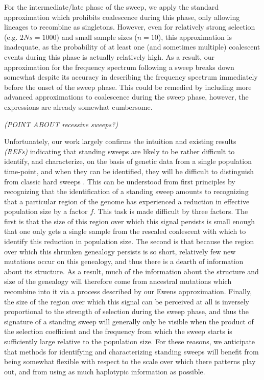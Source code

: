 \documentclass[a4paper,10pt]{article}
\newcommand{\gc}[1]{{\it \color{red} (#1)} }
\begin{document}
For the intermediate/late phase of the sweep, we apply the standard approximation which prohibits coalescence during this phase, only allowing lineages to recombine as singletons. However, even for relatively strong selection (e.g. $2Ns = 1000$) and small sample sizes ($n = 10$), this approximation is inadequate, as the probability of at least one (and sometimes multiple) coalescent events during this phase is actually relatively high. As a result, our approximation for the frequency spectrum following a sweep breaks down somewhat despite its accuracy in describing the frequency spectrum immediately before the onset of the sweep phase. This could be remedied by including more advanced approximations to coalescence during the sweep phase, however, the expressions are already somewhat cumbersome. 

\gc{POINT ABOUT recessive sweeps?}

Unfortunately, our work largely confirms the intuition and existing results \gc{REFs} indicating that standing sweeps are likely to be rather difficult to identify, and characterize, on the basis of genetic data from a single population time-point, and when they can be identified, they will be difficult to distinguish from classic hard sweeps \citep{Peter:2012ht}. This can be understood from first principles by recognizing that the identification of a standing sweep amounts to recognizing that a particular region of the genome has experienced a reduction in effective population size by a factor $f$. This task is made difficult by three factors. The first is that the size of this region over which this signal persists is small enough that one only gets a single sample from the rescaled coalescent with which to identify this reduction in population size. The second is that because the region over which this shrunken genealogy persists is so short, relatively few new mutations occur on this genealogy, and thus there is a dearth of information about its structure. As a result, much of the information about the structure and size of the genealogy will therefore come from ancestral mutations which recombine into it via a process described by our Ewens approximation. Finally, the size of the region over which this signal can be perceived at all is inversely proportional to the strength of selection during the sweep phase, and thus the signature of a standing sweep will generally only be visible when the product of the selection coefficient and the frequency from which the sweep starts is sufficiently large relative to the population size. For these reasons, we anticipate that methods for identifying and characterizing standing sweeps will benefit from being somewhat flexible with respect to the scale over which there patterns play out, and from using as much haplotypic information as possible.
\end{document}
